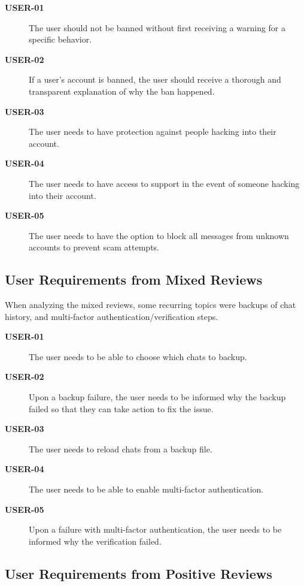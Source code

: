 \begin{description}
    \item[\textbf{USER-01}]
        The user should not be banned without first receiving a warning for a
            specific behavior.
    \item[\textbf{USER-02}]
        If a user's account is banned, the user should receive a thorough and
            transparent explanation of why the ban happened.
    \item[\textbf{USER-03}]
        The user needs to have protection against people hacking into their
            account.
    \item[\textbf{USER-04}]
        The user needs to have access to support in the event of someone hacking
            into their account.
    \item[\textbf{USER-05}]
        The user needs to have the option to block all messages from unknown
            accounts to prevent scam attempts.
\end{description}

\subsection*{User Requirements from Mixed Reviews}

When analyzing the mixed reviews, some recurring topics were
    backups of chat history,
    and multi-factor authentication/verification steps.

\begin{description}
    \item[\textbf{USER-01}]
        The user needs to be able to choose which chats to backup.
    \item[\textbf{USER-02}]
        Upon a backup failure, the user needs to be informed why the backup
            failed so that they can take action to fix the issue.
    \item[\textbf{USER-03}]
        The user needs to reload chats from a backup file.
    \item[\textbf{USER-04}]
        The user needs to be able to enable multi-factor authentication.
    \item[\textbf{USER-05}]
        Upon a failure with multi-factor authentication, the user needs to be
            informed why the verification failed.
\end{description}

\subsection*{User Requirements from Positive Reviews}

